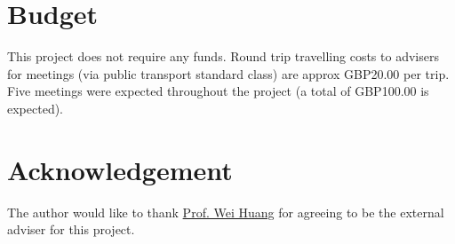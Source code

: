 \documentclass[a4paper, 11pt]{article}
\begin{document}
\section{Budget}
This project does not require any funds.  Round trip travelling costs to advisers for meetings (via public transport standard class) are approx GBP20.00 per trip.  Five meetings were expected throughout the project (a total of GBP100.00 is expected).
\section*{Acknowledgement}
The author would like to thank \href{mailto:wei.huang@eng.ox.ac.uk}{Prof. Wei Huang} for agreeing to be the external adviser for this project.
\nocite{*}\printbibliography
\end{document}

